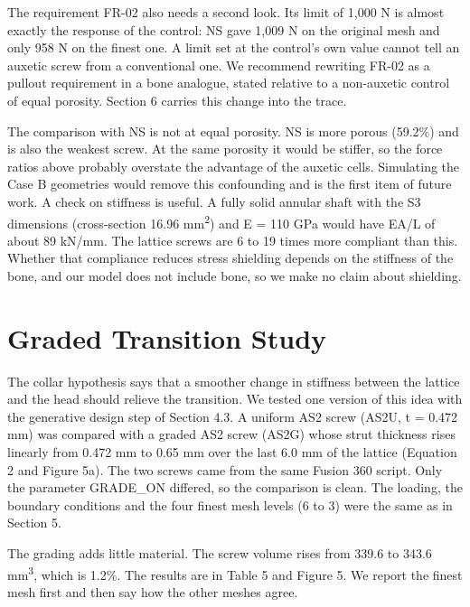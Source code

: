 \documentclass[10pt,twocolumn,letterpaper]{article}
\begin{document}
The requirement FR-02 also needs a second look. Its limit of 1,000 N is almost exactly the response of the control: NS gave 1,009 N on the original mesh and only 958 N on the finest one. A limit set at the control's own value cannot tell an auxetic screw from a conventional one. We recommend rewriting FR-02 as a pullout requirement in a bone analogue, stated relative to a non-auxetic control of equal porosity. Section 6 carries this change into the trace.

The comparison with NS is not at equal porosity. NS is more porous (59.2\%) and is also the weakest screw. At the same porosity it would be stiffer, so the force ratios above probably overstate the advantage of the auxetic cells. Simulating the Case B geometries would remove this confounding and is the first item of future work. A check on stiffness is useful. A fully solid annular shaft with the S3 dimensions (cross-section 16.96 mm\textsuperscript{2}) and E = 110 GPa would have EA/L of about 89 kN/mm. The lattice screws are 6 to 19 times more compliant than this. Whether that compliance reduces stress shielding depends on the stiffness of the bone, and our model does not include bone, so we make no claim about shielding.


\section{Graded Transition Study}
The collar hypothesis says that a smoother change in stiffness between the lattice and the head should relieve the transition. We tested one version of this idea with the generative design step of Section 4.3. A uniform AS2 screw (AS2U, t = 0.472 mm) was compared with a graded AS2 screw (AS2G) whose strut thickness rises linearly from 0.472 mm to 0.65 mm over the last 6.0 mm of the lattice (Equation 2 and Figure 5a). The two screws came from the same Fusion 360 script. Only the parameter GRADE\_ON differed, so the comparison is clean. The loading, the boundary conditions and the four finest mesh levels (6 to 3) were the same as in Section 5.

The grading adds little material. The screw volume rises from 339.6 to 343.6 mm\textsuperscript{3}, which is 1.2\%. The results are in Table 5 and Figure 5. We report the finest mesh first and then say how the other meshes agree.
\end{document}
